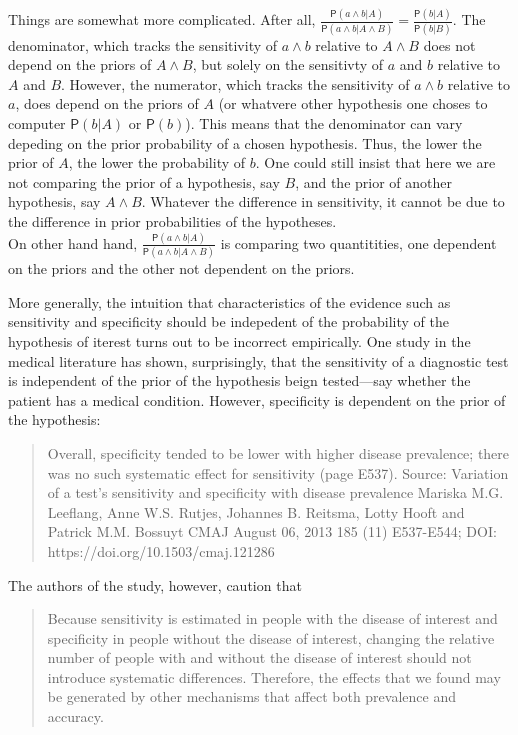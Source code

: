 \documentclass[
  10pt,
  dvipsnames,enabledeprecatedfontcommands]{scrartcl}
\newcommand{\pr}[1]{\mathsf{P}(#1)}
\begin{document}
Things are somewhat more complicated. After all,
\(\frac{\pr{a\wedge b \vert A}}{\pr{a\wedge b \vert A \wedge B}}=\frac{\pr{b \vert A}}{\pr{b \vert B}}\).
The denominator, which tracks the sensitivity of \(a\wedge b\) relative
to \(A\wedge B\) does not depend on the priors of \(A\wedge B\), but
solely on the sensitivty of \(a\) and \(b\) relative to \(A\) and \(B\).
However, the numerator, which tracks the sensitivity of \(a\wedge b\)
relative to \(a\), does depend on the priors of \(A\) (or whatvere other
hypothesis one choses to computer \(\pr{b \vert A}\) or \(\pr{b}\)).
This means that the denominator can vary depeding on the prior
probability of a chosen hypothesis. Thus, the lower the prior of \(A\),
the lower the probability of \(b\). One could still insist that here we
are not comparing the prior of a hypothesis, say \(B\), and the prior of
another hypothesis, say \(A \wedge B\). Whatever the difference in
sensitivity, it cannot be due to the difference in prior probabilities
of the hypotheses.\\
On other hand hand,
\(\frac{\pr{a\wedge b \vert A}}{\pr{a\wedge b \vert A \wedge B}}\) is
comparing two quantitities, one dependent on the priors and the other
not dependent on the priors.

More generally, the intuition that characteristics of the evidence such
as sensitivity and specificity should be indepedent of the probability
of the hypothesis of iterest turns out to be incorrect empirically. One
study in the medical literature has shown, surprisingly, that the
sensitivity of a diagnostic test is independent of the prior of the
hypothesis beign tested---say whether the patient has a medical
condition. However, specificity is dependent on the prior of the
hypothesis:

\begin{quote}
Overall, specificity tended to be
lower with higher disease prevalence; there
was no such systematic effect for sensitivity (page E537).
Source: Variation of a test’s sensitivity and specificity with disease prevalence Mariska M.G. Leeflang, Anne W.S. Rutjes, Johannes B. Reitsma, Lotty Hooft and Patrick M.M. Bossuyt
CMAJ August 06, 2013 185 (11) E537-E544; DOI: https://doi.org/10.1503/cmaj.121286
\end{quote}

\noindent The authors of the study, however, caution that

\begin{quote}
 Because sensitivity is estimated in
people with the disease of interest and specificity
in people without the disease of interest, changing the relative number of people 
with and without the disease of interest should not introduce
systematic differences. Therefore, the effects that
we found may be generated by other mechanisms that affect 
both prevalence and accuracy.
\end{quote}
\end{document}
